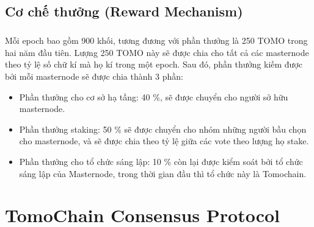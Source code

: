 \documentclass[12pt,a4paper]{article}
\begin{document}
	\subsection{Cơ chế thưởng (Reward Mechanism)}
		\subparagraph{} Mỗi epoch bao gồm 900 khối, tương đương với phần thưởng là 250 TOMO trong hai năm đầu tiên. Lượng 250 TOMO này sẽ được chia cho tất cả các masternode theo tỷ lệ số chữ kí mà họ kí trong một epoch. Sau đó, phần thưởng kiếm được bởi mỗi masternode sẽ được chia thành 3 phần:
		 \begin{itemize}		
			\item Phần thưởng cho cơ sở hạ tầng: 40 \%, sẽ được chuyển cho người sở hữu masternode.
			\item Phần thưởng staking: 50 \% sẽ được chuyển cho nhóm những người bầu chọn cho masternode, và sẽ được chia theo tỷ lệ giữa các vote theo lượng họ stake.
			\item Phần thưởng cho tổ chức sáng lập: 10 \% còn lại được kiểm soát bởi tổ chức sáng lập của Masternode, trong thời gian đầu thì tổ chức này là Tomochain.
		\end{itemize}
		
	
	\section{TomoChain Consensus Protocol}
	
\end{document}
